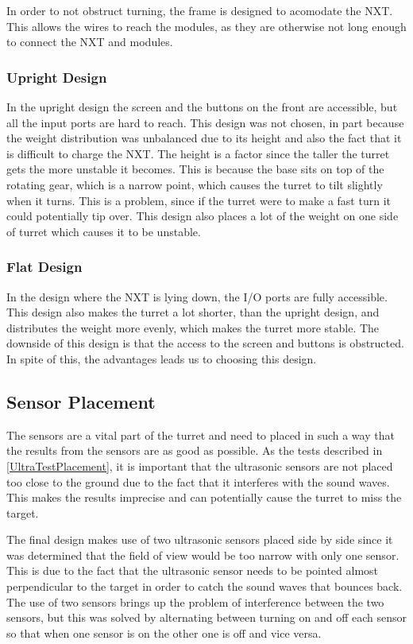 In order to not obstruct turning, the frame is designed to acomodate the NXT.
This allows the wires to reach the modules, as they are otherwise not long
enough to connect the NXT and modules.\nl

\subsubsection{Upright Design}
In the upright design the screen and the buttons on the front
are accessible, but all the input ports are hard to reach. This design was not
chosen, in part because the weight distribution was unbalanced due to its height
and also the fact that it is difficult to charge the NXT. The height is a factor
since the taller the turret gets the more unstable it becomes. This is because
the base sits on top of the rotating gear, which is a narrow point, which causes
the turret to tilt slightly when it turns. This is a problem, since if the
turret were to make a fast turn it could potentially tip over. This design also
places a lot of the weight on one side of turret which causes it to be
unstable.

\subsubsection{Flat Design}
In the design where the NXT is lying down, the I/O ports are fully accessible.
This design also makes the turret a lot shorter, than the upright design, and
distributes the weight more evenly, which makes the turret more stable. The
downside of this design is that the access to the screen and buttons is
obstructed. In spite of this, the advantages leads us to choosing this design.

\subsection{Sensor Placement}
The sensors are a vital part of the turret and need to placed in such a way that
the results from the sensors are as good as possible. As the tests described in
\autoref{UltraTestPlacement}, it is important that the ultrasonic sensors
are not placed too close to the ground due to the fact that it interferes with
the sound waves. This makes the results imprecise and can potentially cause
the turret to miss the target.\nl

The final design makes use of two ultrasonic sensors placed side by side since
it was determined that the field of view would be too narrow with only one
sensor. This is due to the fact that the ultrasonic sensor needs to be pointed
almost perpendicular to the target in order to catch the sound waves that
bounces back. The use of two sensors brings up the problem of interference between the
two sensors, but this was solved by alternating between turning on and off each
sensor so that when one sensor is on the other one is off and vice
versa.\nl

